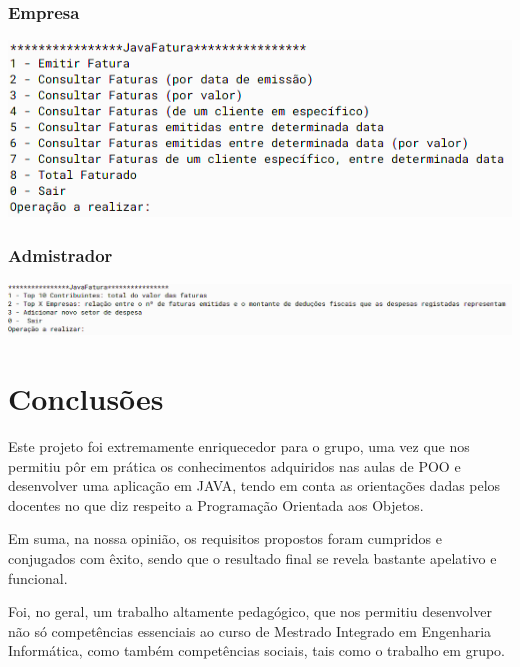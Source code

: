 \documentclass[a4paper]{article}
\begin{document}
\subsubsection{Empresa}

	\includegraphics[width=.9\linewidth]{empresa_menu.png}


\subsubsection{Admistrador}

	\includegraphics[width=1.1\linewidth]{admin_menu.png}




\section{Conclusões}
\label{sec:conclusao}

Este projeto foi extremamente enriquecedor para o grupo, uma vez que nos permitiu pôr em prática os conhecimentos adquiridos nas aulas de POO e desenvolver uma aplicação em JAVA, tendo em conta as orientações dadas pelos docentes no que diz respeito a Programação Orientada aos Objetos. 

Em suma, na nossa opinião, os requisitos propostos foram cumpridos e conjugados com êxito, sendo que o resultado final se revela bastante apelativo e funcional.

Foi, no geral, um trabalho  altamente pedagógico, que nos permitiu desenvolver não só competências essenciais ao curso de Mestrado Integrado em Engenharia Informática, como também competências sociais, tais como o trabalho em grupo.
\end{document}
